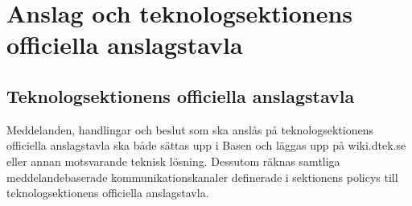 \section{Anslag och teknologsektionens officiella anslagstavla}
\subsection{Teknologsektionens officiella anslagstavla}
Meddelanden, handlingar och beslut som ska anslås på teknologsektionens
officiella anslagstavla ska både sättas upp i Basen och läggas upp på
wiki.dtek.se eller annan motsvarande teknisk lösning. 
Dessutom räknas samtliga meddelandebaserade kommunikationskanaler definerade i sektionens policys till teknologsektionens officiella anslagstavla.
